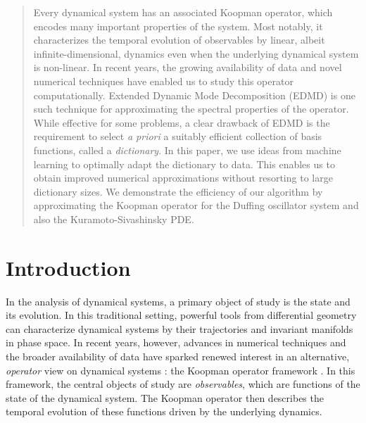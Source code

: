 \documentclass[%
 aip,
 cha,
 sd,%
 amsmath,amssymb,
 preprint,%
]{revtex4-1}
\begin{document}
\maketitle

\begin{quotation}
Every dynamical system has an associated Koopman operator, which encodes many important properties of the system. Most notably, it characterizes the temporal evolution of observables by linear, albeit infinite-dimensional, dynamics even when the underlying dynamical system is non-linear. In recent years, the growing availability of data and novel numerical techniques have enabled us to study this operator computationally. 
Extended Dynamic Mode Decomposition (EDMD) is one such technique for approximating the spectral properties of the operator. While effective for some problems, a clear drawback of EDMD is the requirement to select \emph{a priori} a suitably efficient collection of basis functions, called a \emph{dictionary}. 
In this paper, we use ideas from machine learning to optimally adapt the dictionary to data. This enables us to obtain improved numerical approximations without resorting to large dictionary sizes. 
We demonstrate the efficiency of our algorithm by approximating the Koopman operator for the Duffing oscillator system and also the Kuramoto-Sivashinsky PDE.
\end{quotation}

\section{Introduction}

In the analysis of dynamical systems, a primary object of study is the state and its evolution. In this traditional setting, powerful tools from differential geometry can characterize dynamical systems by their trajectories and invariant manifolds in phase space. 
In recent years, however, advances in numerical techniques and the broader availability of data have sparked renewed interest in an alternative, {\it operator} view on dynamical systems \cite{mezic-2004,mezic-2005}: the Koopman operator framework \cite{koopman1931hamiltonian}. In this framework, the central objects of study are {\it observables}, which are functions of the state of the dynamical system. The Koopman operator then describes the temporal evolution of these functions driven by the underlying dynamics. 
\end{document}
